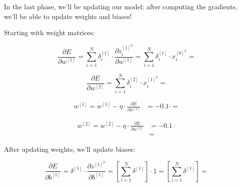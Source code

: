 \documentclass[12pt]{article}
\begin{document}
\begin{enumerate}[leftmargin=\labelsep]
        In the last phase, we'll be updating our model: after computing the gradients,
        we'll be able to update weights and biases!

        Starting with weight matrices:

        \begin{equation*}
          \frac{\partial E}{\partial w^{[1]}} = \sum_{i=1}^N \delta_i^{[1]} \cdot
          \frac{\partial z_i^{[1]^T}}{\partial w^{[1]}}
          = \sum_{i=1}^N \delta_i^{[1]} \cdot x_i^{[0]^T}
          = 
        \end{equation*}

        \begin{equation*}
          \frac{\partial E}{\partial w^{[2]}}
          = \sum_{i=1}^N \delta_i^{[2]}
          \cdot x_i^{[1]^T}
          = 
        \end{equation*}

        \begin{equation*}
          \begin{aligned}
            w^{[1]} = w^{[1]} - \eta \cdot \frac{\partial E}{\partial w^{[1]}}
             & =  - 0.1 \cdot 
            = 
          \end{aligned}
        \end{equation*}

        \begin{equation*}
          \begin{aligned}
            w^{[2]} = w^{[2]} - \eta \cdot \frac{\partial E}{\partial w^{[2]}}
             & =  - 0.1 \cdot  \\
             & = 
          \end{aligned}
        \end{equation*}

        After updating weights, we'll update biases:

        \begin{equation*}
          \frac{\partial E}{\partial b^{[1]}} = \delta^{[1]} \cdot
          \frac{\partial z^{[1]^T}}{\partial b^{[1]}}
          = \left[\sum_{i=1}^N \delta^{[1]}\right] \cdot 1
          = \left[\sum_{i=1}^N \delta^{[1]}\right]
          = 
        \end{equation*}


\end{enumerate}
\end{document}
